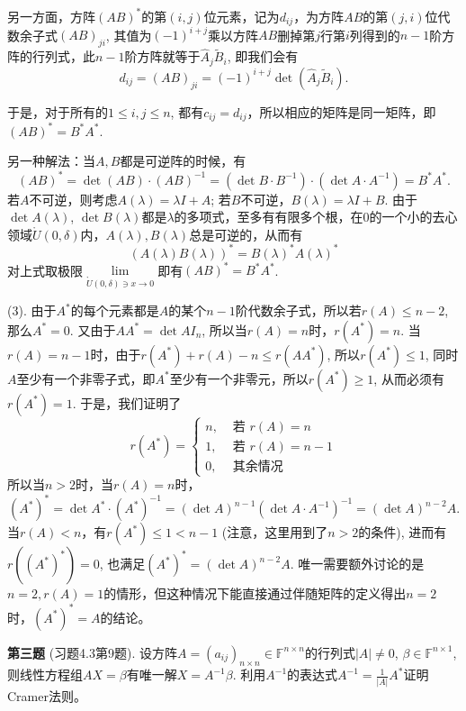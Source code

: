 另一方面，方阵$(AB)^*$的第$(i,j)$位元素，记为$d_{ij}$，为方阵$AB$的第$(j,i)$位代数余子式$(AB)_{ji}$, 其值为$(-1)^{i+j}$乘以方阵$AB$删掉第$j$行第$i$列得到的$n-1$阶方阵的行列式，此$n-1$阶方阵就等于$\widehat{A}_j \widetilde{B}_i$, 即我们会有
$$d_{ij} = (AB)_{ji} = (-1)^{i+j} \det(\widehat{A}_j \widetilde{B}_i).$$

于是，对于所有的$1\leqslant i,j \leqslant n$, 都有$c_{ij} = d_{ij}$，所以相应的矩阵是同一矩阵，即$(AB)^* = B^*A^*$.

另一种解法：当$A,B$都是可逆阵的时候，有
$$(AB)^* = \det(AB) \cdot (AB)^{-1} = (\det B \cdot B^{-1}) \cdot (\det A \cdot A^{-1}) = B^*A^*.$$
若$A$不可逆，则考虑$A(\lambda) = \lambda I + A$; 若$B$不可逆，$B(\lambda) = \lambda I + B$. 由于$\det A(\lambda)$, $\det B(\lambda)$都是$\lambda$的多项式，至多有有限多个根，在$0$的一个小的去心领域$\mathring{U}(0,\delta)$内，$A(\lambda), B(\lambda)$总是可逆的，从而有
$$(A(\lambda)B(\lambda))^* = B(\lambda)^*A(\lambda)^*$$
对上式取极限$\lim\limits_{\mathring{U}(0,\delta) \ni x\to 0}$即有$(AB)^* = B^*A^*$.

(3). 由于$A^*$的每个元素都是$A$的某个$n-1$阶代数余子式，所以若$r(A)\leqslant n-2$, 那么$A^* = 0$. 又由于$AA^* = \det A I_n$, 所以当$r(A) = n$时，$r(A^*) = n$. 当$r(A) = n-1$时，由于$r(A^*) + r(A) - n \leqslant r(AA^*)$, 所以$r(A^*) \leqslant 1$, 同时$A$至少有一个非零子式，即$A^*$至少有一个非零元，所以$r(A^*) \geqslant 1$, 从而必须有$r(A^*) = 1$. 于是，我们证明了
$$r(A^*) = \begin{cases} n, & \text{ 若 } r(A) = n \\ 1, & \text{ 若 } r(A) = n-1 \\ 0, & \text{ 其余情况} \end{cases}$$
所以当$n > 2$时，当$r(A) = n$时，
$$(A^*)^* = \det A^* \cdot (A^*)^{-1} = (\det A)^{n-1} (\det A \cdot A^{-1})^{-1} = (\det A)^{n-2} A.$$
当$r(A) < n$，有$r(A^*) \leqslant 1 < n-1$ (注意，这里用到了$n > 2$的条件), 进而有$r((A^*)^*) = 0$, 也满足$(A^*)^* = (\det A)^{n-2}A$. 唯一需要额外讨论的是$n=2, r(A) = 1$的情形，但这种情况下能直接通过伴随矩阵的定义得出$n = 2$时，$(A^*)^* = A$的结论。

\fi  %

\newpageorvspace

{\bf 第三题} (习题4.3第9题). 设方阵$A = (a_{ij})_{n\times n} \in \mathbb{F}^{n\times n}$的行列式$|A| \neq 0$, $\beta\in\mathbb{F}^{n\times 1}$, 则线性方程组$AX=\beta$有唯一解$X = A^{-1}\beta$. 利用$A^{-1}$的表达式$A^{-1} = \frac{1}{|A|}A^*$证明Cramer法则。

